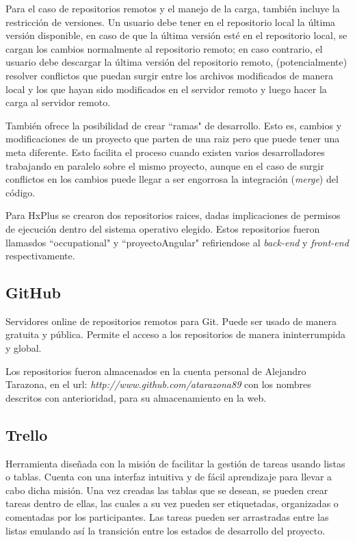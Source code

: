         Para el caso de repositorios remotos y el manejo de la carga, también incluye la restricción de versiones. Un usuario debe tener en el repositorio local la última versión disponible, en caso de que la última versión esté en el repositorio local, se cargan los cambios normalmente al repositorio remoto; en caso contrario, el usuario debe descargar la última versión del repositorio remoto, (potencialmente) resolver conflictos que puedan surgir entre los archivos modificados de manera local y los que hayan sido modificados en el servidor remoto y luego hacer la carga al servidor remoto.
        
        También ofrece la posibilidad de crear ``ramas" de desarrollo. Esto es, cambios y modificaciones de un proyecto que parten de una raiz pero que puede tener una meta diferente. Esto facilita el proceso cuando existen varios desarrolladores trabajando en paralelo sobre el mismo proyecto, aunque en el caso de surgir conflictos en los cambios puede llegar a ser engorrosa la integración (\textit{merge}) del código.
        
        Para HxPlus se crearon dos repositorios raices, dadas implicaciones de permisos de ejecución dentro del sistema operativo elegido. Estos repositorios fueron llamasdos ``occupational" y ``proyectoAngular" refiriendose al \textit{back-end} y \textit{front-end} respectivamente.
        
        \subsection{GitHub}
        \label{tecno-github}
        
        Servidores online de repositorios remotos para Git. Puede ser usado de manera gratuita y pública. Permite el acceso a los repositorios de manera ininterrumpida y global.
        
        Los repositorios fueron almacenados en la cuenta personal de Alejandro Tarazona, en el url: \textit{http://www.github.com/atarazona89} con los nombres descritos con anterioridad, para su almacenamiento en la web.
        
        \subsection{Trello}
        \label{tecno-trello}
        
        Herramienta diseñada con la misión de facilitar la gestión de tareas usando listas o tablas. Cuenta con una interfaz intuitiva y de fácil aprendizaje para llevar a cabo dicha misión. Una vez creadas las tablas que se desean, se pueden crear tareas dentro de ellas, las cuales a su vez pueden ser etiquetadas, organizadas o comentadas por los participantes. Las tareas pueden ser arrastradas entre las listas emulando así la transición entre los estados de desarrollo del proyecto.
    
\pagebreak